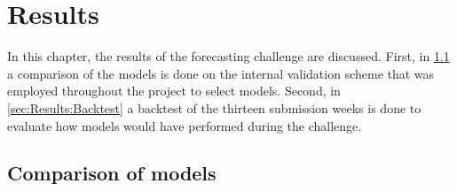 \newpage
\section{Results}
\label{ch:Results}

In this chapter, the results of the forecasting challenge are discussed. First, in \cref{sec:Results:ComparisonModels} a comparison of the models is done on the internal validation scheme that was employed throughout the project to select models. Second, in \cref{sec:Results:Backtest} a backtest of the thirteen submission weeks is done to evaluate how models would have performed during the challenge. 

\subsection{Comparison of models}
\label{sec:Results:ComparisonModels}

\begin{table}[htp]
\centering
{}
\caption{Results of Timeseries Cross-Validation on the Daily Bike Count Dataset. Best values are highlighted in bold.}
\label{tab:bikes_results}
\end{table}

